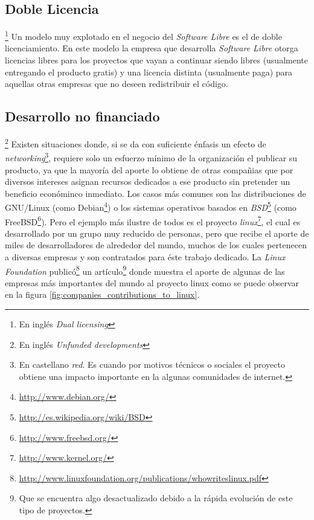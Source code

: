\subsection{Doble Licencia}\footnote{En ingl\'es \emph{Dual licensing}}
%
Un modelo muy explotado en el negocio del \emph{Software Libre} es el de doble
licenciamiento. En este modelo la empresa que desarrolla \emph{Software
Libre} otorga licencias libres para los proyectos que vayan a continuar siendo
libres (usualmente entregando el producto gratis) y una licencia distinta
(usualmente paga) para aquellas otras empresas que no deseen redistribuir el
c\'odigo. 

\subsection{Desarrollo no financiado}\footnote{En ingl\'es \emph{Unfunded
developments}}
%
Existen situaciones donde, si se da con suficiente \'enfasis un efecto de
\emph{networking}\footnote{En castellano \emph{red}. Es cuando por motivos
t\'ecnicos o sociales el proyecto obtiene una impacto importante en la
algunas comunidades de internet.}, requiere solo un esfuerzo m\'inimo de la
organizaci\'on el publicar su producto, ya que la mayor\'ia del aporte lo
obtiene de otras compa\~nias que por diversos intereses asignan recursos
dedicados a ese producto sin pretender un beneficio econ\'ominco inmediato.
Los casos m\'as comunes son las distribuciones de GNU/Linux (como
Debian\footnote{\url{http://www.debian.org/}}) o los sistemas operativos
basados en \emph{BSD}\footnote{\url{http://es.wikipedia.org/wiki/BSD}} (como
FreeBSD\footnote{\url{http://www.freebsd.org/}}). Pero el ejemplo m\'as
ilustre de todos es el proyecto
\emph{linux}\footnote{\url{http://www.kernel.org/}}, el cual es desarrollado
por un grupo muy reducido de personas, pero que recibe el aporte de miles de
desarrolladores de alrededor del mundo, muchos de los cuales pertenecen a
diversas empresas y son contratados para \'este trabajo dedicado.
La \emph{Linux Foundation}
public\'o\footnote{\url{
http://www.linuxfoundation.org/publications/whowriteslinux.pdf}} un
art\'iculo\footnote{Que se encuentra algo desactualizado debido a la r\'apida
evoluci\'on de este tipo de proyectos.} donde muestra el aporte de algunas de
las empresas m\'as importantes del mundo al proyecto linux como se puede
observar en la figura \ref{fig:companies_contributions_to_linux}.

